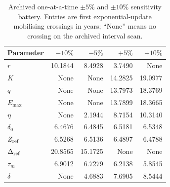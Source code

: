 \begin{table}[htbp]
\centering\small
\caption{Archived one-at-a-time \(\pm5\%\) and \(\pm10\%\) sensitivity battery. Entries are first exponential-update mobilising crossings in years; ``None'' means no crossing on the archived interval scan.}
\label{tab:ota5}
\begin{tabular}{@{}lrrrr@{}}
\toprule
Parameter & \(-10\%\) & \(-5\%\) & \(+5\%\) & \(+10\%\) \\
\midrule
\(r\) & 10.1844 & 8.4928 & 3.7490 & None \\
\(K\) & None & None & 14.2825 & 19.0977 \\
\(q\) & None & None & 13.7973 & 18.3769 \\
\(E_{\max}\) & None & None & 13.7899 & 18.3665 \\
\(\eta\) & None & 2.1944 & 8.7154 & 10.3140 \\
\(\delta_0\) & 6.4676 & 6.4845 & 6.5181 & 6.5348 \\
\(Z_{\rm ref}\) & 6.5268 & 6.5136 & 6.4897 & 6.4788 \\
\(\Delta_{\rm ref}\) & 20.8565 & 15.1725 & None & None \\
\(\tau_m\) & 6.9012 & 6.7279 & 6.2138 & 5.8545 \\
\(\delta\) & None & 4.6883 & 7.6905 & 8.5444 \\
\bottomrule
\end{tabular}
\end{table}

